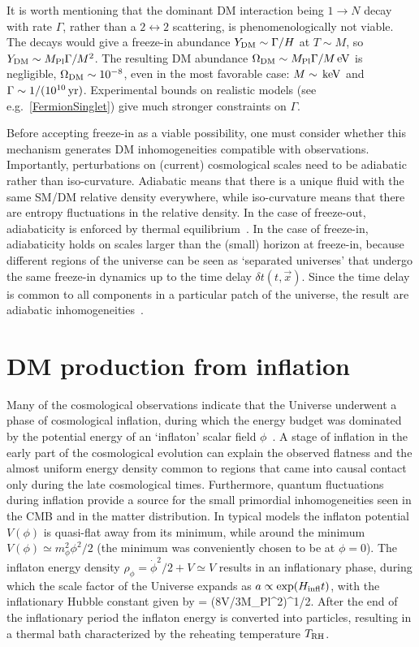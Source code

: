 It is worth mentioning that the dominant DM interaction being
 $1\to N$ decay with rate $\Gamma$, 
rather than a $2\leftrightarrow 2$ scattering, is phenomenologically not viable.
The decays would give a freeze-in abundance $Y_{\rm DM} \sim \Gamma/H$ at $T \sim M$, so $Y_{\rm DM} \sim M_{\rm Pl} \Gamma/M^2$.
The resulting DM abundance $\Omega_{\rm DM} \sim M_{\rm Pl} \Gamma/M  \,{\rm eV}$
is negligible, $\Omega_{\rm DM}  \sim 10^{-8}$, even in the most favorable case:
$M \sim\,{\rm keV}$ and $\Gamma \sim 1/(10^{10}\,{\rm yr})$. Experimental bounds on realistic models (see e.g.~\ref{FermionSinglet})
give much stronger constraints on $\Gamma$.

\medskip

Before accepting freeze-in as a viable possibility, one must consider whether this mechanism generates DM inhomogeneities
compatible with observations. Importantly, perturbations
on (current) cosmological scales need to be adiabatic rather than iso-curvature.
Adiabatic means that there is a unique fluid with the same SM/DM relative density everywhere,
while iso-curvature means that there are entropy fluctuations in the relative density.
In the case of freeze-out, adiabaticity is enforced by thermal equilibrium~\cite{AdiabaticDM}.
In the case of freeze-in, adiabaticity holds on scales larger than the (small) horizon at freeze-in,
because different regions of the universe can be seen as `separated universes' that undergo the same freeze-in
dynamics up to the time delay $\delta t(t,\vec{x})$. Since the time delay is common to all components in a particular patch of the universe, the result are adiabatic inhomogeneities~\cite{AdiabaticDM}.


\section{DM production from inflation}\label{sec:inflDMprod}
Many  of the cosmological observations indicate 
that the Universe underwent a phase of cosmological inflation, during which the energy budget was dominated by the 
potential energy of an `inflaton' scalar field $\phi$~\cite{cosmobooks}.
A stage of inflation in the early part of the cosmological evolution can explain the observed flatness and the almost uniform energy density 
common to regions that came into causal contact only during the late cosmological times. 
Furthermore, quantum fluctuations during inflation
 provide a source for the small primordial inhomogeneities seen in the CMB and in the matter distribution.
In typical models the inflaton potential $V(\phi)$  is quasi-flat away from its minimum, while around the minimum $V(\phi) \simeq m_\phi^2 \phi^2/2$ (the minimum was conveniently 
chosen to be at $\phi=0$).
The inflaton energy density $\rho_\phi = \dot \phi^2/2 + V \simeq V$  results in an inflationary phase, during which the
scale factor of the Universe expands as $a \propto \exp(H_{\rm infl} t)$, with the inflationary
Hubble constant given by
\beq \HI =  (8\pi V/3M_{\rm Pl}^2)^{1/2}.
\eeq
After the end of the inflationary period the inflaton energy is converted into particles, resulting in a thermal bath characterized by the reheating temperature  $T_{\rm RH}$.

